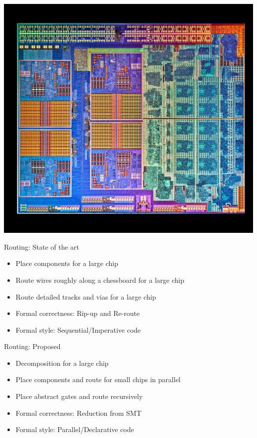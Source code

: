\documentclass[aspectratio=169]{beamer}
\begin{document}
{
\begin{frame}
    \begin{center}
        \includegraphics[height=\textheight]{images/VLSI01_rotated.jpg}
    \end{center}
\end{frame} 
}

\begin{frame}{Routing: State of the art}
	\begin{itemize}
        \setlength\itemsep{1em}
		\item Place components for a large chip
		\item Route wires roughly along a chessboard for a large chip
		\item Route detailed tracks and vias for a large chip
		\item Formal correctness: Rip-up and Re-route
		\item Formal style: Sequential/Imperative code
	\end{itemize}
\end{frame}

\begin{frame}{Routing: Proposed}
	\begin{itemize}
        \setlength\itemsep{1em}
		\item Decomposition for a large chip
		\item Place components and route for small chips in parallel
		\item Place abstract gates and route recursively
		\item Formal correctness: Reduction from SMT
		\item Formal style: Parallel/Declarative code
	\end{itemize}
\end{frame}
\end{document}

